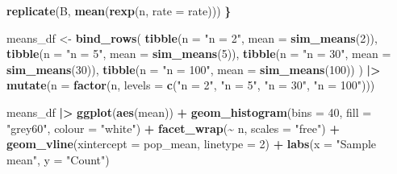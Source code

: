 \documentclass[
]{article}
\newenvironment{Shaded}{\begin{snugshade}}{\end{snugshade}}
\newcommand{\AttributeTok}[1]{\textcolor[rgb]{0.13,0.29,0.53}{#1}}
\newcommand{\DecValTok}[1]{\textcolor[rgb]{0.00,0.00,0.81}{#1}}
\newcommand{\ErrorTok}[1]{\textcolor[rgb]{0.64,0.00,0.00}{\textbf{#1}}}
\newcommand{\FunctionTok}[1]{\textcolor[rgb]{0.13,0.29,0.53}{\textbf{#1}}}
\newcommand{\NormalTok}[1]{#1}
\newcommand{\OtherTok}[1]{\textcolor[rgb]{0.56,0.35,0.01}{#1}}
\newcommand{\SpecialCharTok}[1]{\textcolor[rgb]{0.81,0.36,0.00}{\textbf{#1}}}
\newcommand{\StringTok}[1]{\textcolor[rgb]{0.31,0.60,0.02}{#1}}
\begin{document}
\begin{Shaded}
\begin{Highlighting}[]
  \FunctionTok{replicate}\NormalTok{(B, }\FunctionTok{mean}\NormalTok{(}\FunctionTok{rexp}\NormalTok{(n, }\AttributeTok{rate =}\NormalTok{ rate)))}
\ErrorTok{\}}

\NormalTok{means\_df }\OtherTok{\textless{}{-}} \FunctionTok{bind\_rows}\NormalTok{(}
  \FunctionTok{tibble}\NormalTok{(}\AttributeTok{n =} \StringTok{"n = 2"}\NormalTok{,   }\AttributeTok{mean =} \FunctionTok{sim\_means}\NormalTok{(}\DecValTok{2}\NormalTok{)),}
  \FunctionTok{tibble}\NormalTok{(}\AttributeTok{n =} \StringTok{"n = 5"}\NormalTok{,   }\AttributeTok{mean =} \FunctionTok{sim\_means}\NormalTok{(}\DecValTok{5}\NormalTok{)),}
  \FunctionTok{tibble}\NormalTok{(}\AttributeTok{n =} \StringTok{"n = 30"}\NormalTok{,  }\AttributeTok{mean =} \FunctionTok{sim\_means}\NormalTok{(}\DecValTok{30}\NormalTok{)),}
  \FunctionTok{tibble}\NormalTok{(}\AttributeTok{n =} \StringTok{"n = 100"}\NormalTok{, }\AttributeTok{mean =} \FunctionTok{sim\_means}\NormalTok{(}\DecValTok{100}\NormalTok{))}
\NormalTok{) }\SpecialCharTok{|\textgreater{}}
  \FunctionTok{mutate}\NormalTok{(}\AttributeTok{n =} \FunctionTok{factor}\NormalTok{(n, }\AttributeTok{levels =} \FunctionTok{c}\NormalTok{(}\StringTok{"n = 2"}\NormalTok{, }\StringTok{"n = 5"}\NormalTok{, }\StringTok{"n = 30"}\NormalTok{, }\StringTok{"n = 100"}\NormalTok{)))}
\end{Highlighting}
\end{Shaded}

\begin{Shaded}
\begin{Highlighting}[]
\NormalTok{means\_df }\SpecialCharTok{|\textgreater{}}
  \FunctionTok{ggplot}\NormalTok{(}\FunctionTok{aes}\NormalTok{(mean)) }\SpecialCharTok{+}
  \FunctionTok{geom\_histogram}\NormalTok{(}\AttributeTok{bins =} \DecValTok{40}\NormalTok{, }\AttributeTok{fill =} \StringTok{"grey60"}\NormalTok{, }\AttributeTok{colour =} \StringTok{"white"}\NormalTok{) }\SpecialCharTok{+}
  \FunctionTok{facet\_wrap}\NormalTok{(}\SpecialCharTok{\textasciitilde{}}\NormalTok{ n, }\AttributeTok{scales =} \StringTok{"free"}\NormalTok{) }\SpecialCharTok{+}
  \FunctionTok{geom\_vline}\NormalTok{(}\AttributeTok{xintercept =}\NormalTok{ pop\_mean, }\AttributeTok{linetype =} \DecValTok{2}\NormalTok{) }\SpecialCharTok{+}
  \FunctionTok{labs}\NormalTok{(}\AttributeTok{x =} \StringTok{"Sample mean"}\NormalTok{, }\AttributeTok{y =} \StringTok{"Count"}\NormalTok{)}
\end{Highlighting}
\end{Shaded}
\end{document}
